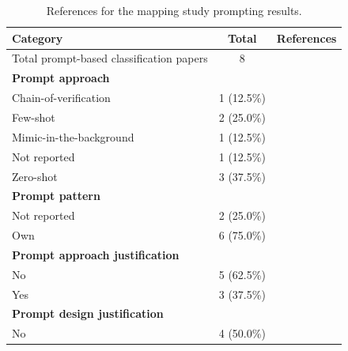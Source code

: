 \documentclass[a4paper]{article}
\begin{document}
\begin{appendices}
\begin{table}[ht]
	\caption{References for the mapping study prompting results.}
	\begin{tabularx}{\textwidth}{|l|c|X|}
		\hline
		\textbf{Category} & \textbf{Total} & \textbf{References} \\
		\hline
		Total prompt-based classification papers & 8 & \cite{10.1145/3597503.3639117,10.1145/3597503.3639194,10.1145/3663529.3663785,10.1145/3663529.3663794,10648982,10659742,10746847,10599336} \\
		\hline
		\textbf{Prompt approach} && \\
		\hspace{3mm} Chain-of-verification & 1 (12.5\%) & \cite{10.1145/3597503.3639194} \\
		\hspace{3mm} Few-shot & 2 (25.0\%) & \cite{10746847,10599336} \\
		\hspace{3mm} Mimic-in-the-background & 1 (12.5\%) & \cite{10.1145/3597503.3639117} \\
		\hspace{3mm} Not reported & 1 (12.5\%) & \cite{10.1145/3663529.3663785} \\
		\hspace{3mm} Zero-shot & 3 (37.5\%) & \cite{10.1145/3663529.3663794,10648982,10659742} \\
		\textbf{Prompt pattern} && \\
		\hspace{3mm} Not reported & 2 (25.0\%) & \cite{10.1145/3663529.3663785,10746847} \\
		\hspace{3mm} Own & 6 (75.0\%) & \cite{10.1145/3597503.3639117,10.1145/3597503.3639194,10.1145/3663529.3663794,10648982,10659742,10599336} \\
		\textbf{Prompt approach justification} && \\
		\hspace{3mm} No & 5 (62.5\%) & \cite{10.1145/3663529.3663785,10.1145/3663529.3663794,10648982,10659742,10746847} \\
		\hspace{3mm} Yes & 3 (37.5\%) & \cite{10.1145/3597503.3639117,10.1145/3597503.3639194,10599336} \\
		\textbf{Prompt design justification} && \\
		\hspace{3mm} No & 4 (50.0\%) & \cite{10.1145/3597503.3639194,10.1145/3663529.3663785,10648982,10746847} \\

\end{tabularx}
\end{table}
\end{appendices}
\end{document}
